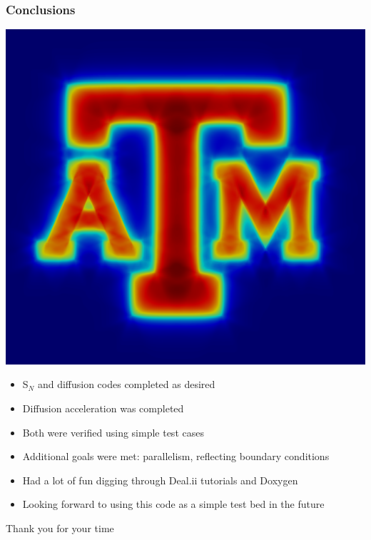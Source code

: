 \documentclass[xcolor={usenames,dvipsnames,svgnames,table}, 10pt]{beamer}
\begin{document}
\begin{frame}\frametitle{Conclusions}
	\vfill
	\centering
	\begin{minipage}{0.4\linewidth}
		\centering
		\includegraphics[width=0.9\linewidth]{images/atm}
	\end{minipage}
	\begin{minipage}{0.59\linewidth}
		\begin{itemize}
			\setlength\itemsep{0.2em}
			\item S$_N$ and diffusion codes completed as desired
			\item Diffusion acceleration was completed
			\item Both were verified using simple test cases
			\item Additional goals were met: parallelism, reflecting boundary conditions
			\item Had a lot of fun digging through Deal.ii tutorials and Doxygen
			\item Looking forward to using this code as a simple test bed in the future
		\end{itemize}
	\end{minipage}
	\vfill
	\centering
	{\Large Thank you for your time \smiley{}}
\end{frame}
\end{document}

